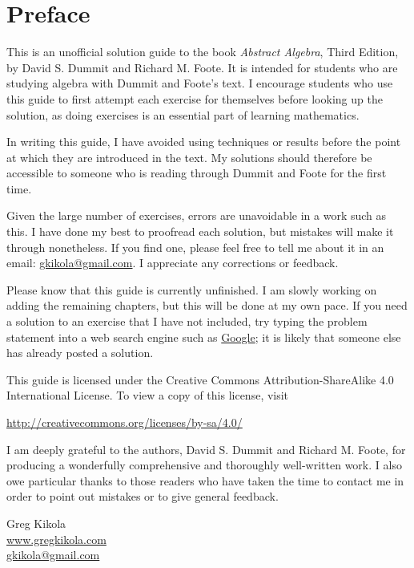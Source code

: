 \chapter{Preface}

This is an unofficial solution guide to the book {\em Abstract
  Algebra}, Third Edition, by David S. Dummit and Richard M. Foote. It
is intended for students who are studying algebra with Dummit and
Foote's text. I encourage students who use this guide to first attempt
each exercise for themselves before looking up the solution, as doing
exercises is an essential part of learning mathematics.

In writing this guide, I have avoided using techniques or results
before the point at which they are introduced in the text. My
solutions should therefore be accessible to someone who is reading
through Dummit and Foote for the first time.

Given the large number of exercises, errors are unavoidable in a work
such as this. I have done my best to proofread each solution, but
mistakes will make it through nonetheless. If you find one, please
feel free to tell me about it in an email:
\href{mailto:gkikola@gmail.com}{gkikola@gmail.com}. I appreciate any
corrections or feedback.

Please know that this guide is currently unfinished. I am slowly
working on adding the remaining chapters, but this will be done at my
own pace. If you need a solution to an exercise that I have not
included, try typing the problem statement into a web search engine
such as \href{https://www.google.com}{Google}; it is likely that
someone else has already posted a solution.

This guide is licensed under the Creative Commons
Attribution-ShareAlike 4.0 International License. To view a copy of
this license, visit
\begin{center}
  \href{http://creativecommons.org/licenses/by-sa/4.0/}
  {http://creativecommons.org/licenses/by-sa/4.0/}
\end{center}

I am deeply grateful to the authors, David S. Dummit and Richard
M. Foote, for producing a wonderfully comprehensive and thoroughly
well-written work. I also owe particular thanks to those readers who
have taken the time to contact me in order to point out mistakes or to
give general feedback.

\begin{flushright}
  Greg Kikola\\
  \href{https://www.gregkikola.com/}{www.gregkikola.com}\\
  \href{mailto:gkikola@gmail.com}{gkikola@gmail.com}
\end{flushright}
